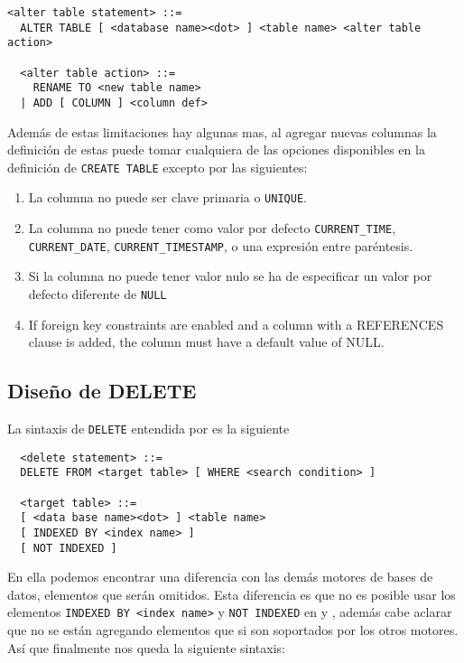 %  
\begin{Verbatim}[frame=single, label=sintaxis para ALTER TABLE]
<alter table statement> ::= 
  ALTER TABLE [ <database name><dot> ] <table name> <alter table action>
  
  <alter table action> ::=
    RENAME TO <new table name>
  | ADD [ COLUMN ] <column def>
\end{Verbatim}

Además de estas limitaciones hay algunas mas, al agregar nuevas columnas la definición de estas puede tomar cualquiera de las opciones disponibles en la definición de \verb=CREATE TABLE= excepto por las siguientes:

\begin{enumerate}

\item La columna no puede ser clave primaria o \verb=UNIQUE=.

\item La columna no puede tener como valor por defecto \verb=CURRENT_TIME=, \verb=CURRENT_DATE=, \verb=CURRENT_TIMESTAMP=, o una expresión entre paréntesis.

\item Si la columna no puede tener valor nulo se ha de especificar un valor por defecto diferente de \verb=NULL=

\item If foreign key constraints are enabled and a column with a REFERENCES clause is added, the column must have a default value of NULL.

\end{enumerate}



\subsection{Diseño de DELETE}
La sintaxis de \verb=DELETE= entendida por \s es la siguiente
\begin{Verbatim}
  <delete statement> ::=
  DELETE FROM <target table> [ WHERE <search condition> ]

  <target table> ::=
  [ <data base name><dot> ] <table name>
  [ INDEXED BY <index name> ]
  [ NOT INDEXED ]
\end{Verbatim}
En ella podemos encontrar una diferencia con las demás motores de bases de datos, elementos que serán omitidos. Esta diferencia es que no es posible usar los elementos \verb=INDEXED BY <index name>= y \verb=NOT INDEXED= en \p y \m, además cabe aclarar que no se están agregando elementos que si son soportados por los otros motores. Así que finalmente nos queda la siguiente sintaxis:


